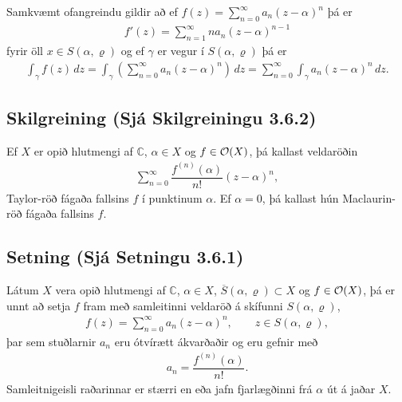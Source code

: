 \documentclass[a4paper,10pt,icelandic]{sphinxmanual}
\begin{document}
Samkvæmt ofangreindu gildir að ef \(f(z)=\sum_{n=0}^\infty a_n(z-\alpha)^n\) þá er
\begin{equation*}
\begin{split}f'(z)=\sum_{n=1}^\infty na_n(z-\alpha)^{n-1}\end{split}
\end{equation*}
fyrir öll \(x\in S(\alpha,\varrho)\) og ef \(\gamma\) er vegur í \(S(\alpha, \varrho)\) þá er
\begin{equation*}
\begin{split}\int_\gamma f(z)\,dz
=\int_\gamma \left(\sum_{n=0}^\infty a_n(z-\alpha)^n\right)\,dz
=\sum_{n=0}^\infty\int_\gamma a_n(z-\alpha)^n\,dz.\end{split}
\end{equation*}

\subsection{Skilgreining (Sjá Skilgreiningu 3.6.2)}
\label{\detokenize{Kafli03:skilgreining-sja-skilgreiningu-3-6-2}}
Ef \(X\) er opið hlutmengi af \({\mathbb{C}}\), \(\alpha\in X\) og \(f\in {\cal O}(X)\), þá kallast veldaröðin
\begin{equation*}
\begin{split}\sum\limits_{n=0}^\infty \dfrac{f^{(n)}(\alpha)}{n!}(z-\alpha)^n,\end{split}
\end{equation*}
Taylor-röð fágaða fallsins \(f\) í punktinum \(\alpha\). Ef \(\alpha=0\), þá kallast hún Maclaurin-röð fágaða fallsins \(f\).


\subsection{Setning (Sjá Setningu 3.6.1)}
\label{\detokenize{Kafli03:setning-sja-setningu-3-6-1}}
Látum \(X\) vera opið hlutmengi af \({\mathbb{C}}\), \(\alpha\in X\), \(\overline S(\alpha,\varrho)\subset X\) og \(f\in {\cal O}(X)\), þá er unnt að setja \(f\) fram með samleitinni veldaröð á skífunni \(S(\alpha,\varrho)\),
\begin{equation*}
\begin{split}f(z)=\sum_{n=0}^ \infty a_n(z-\alpha)^ n,
\qquad z\in S(\alpha,\varrho),\end{split}
\end{equation*}
þar sem stuðlarnir \(a_n\) eru ótvírætt ákvarðaðir og eru gefnir með
\begin{equation*}
\begin{split}a_n=\dfrac {f^{(n)}(\alpha)}{n!}.\end{split}
\end{equation*}
Samleitnigeisli raðarinnar er stærri en eða jafn fjarlægðinni frá \(\alpha\) út á jaðar \(X\).
\end{document}
